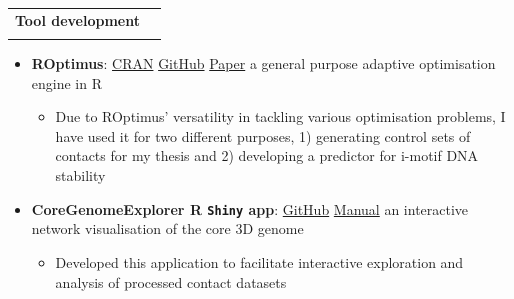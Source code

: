 \documentclass{article}
\makeatletter
\newcommand{\resumeItem}[2]{
  \item\small{
    \textbf{#1}{: #2 \vspace{-2pt}}
  }
}
\newcommand{\resumeSubheading}[4]{
  \vspace{-1pt}\item
    \begin{tabular*}{0.97\textwidth}[t]{l@{\extracolsep{\fill}}r}
      \textbf{#1} & #2 \\
      \textit{\small#3} & \textit{\small #4} \\
    \end{tabular*}\vspace{-5pt}
}
\newcommand{\resumeItemListStart}{\begin{itemize}}
\newcommand{\resumeItemListEnd}{\end{itemize}\vspace{-5pt}}
\makeatother
\begin{document}
        \resumeSubheading
        {Tool development}{}{}{}
            \resumeItemListStart
                \resumeItem{\textbf{ROptimus}}{\href{https://cran.r-project.org/web/packages/ROptimus/index.html}{CRAN} \href{https://github.com/SahakyanLab/ROptimus}{GitHub} \href{https://academic.oup.com/bioinformatics/article/39/5/btad292/7152277}{Paper} a general purpose adaptive optimisation engine in R}
                    \begin{itemize}
                        \item{Due to ROptimus' versatility in tackling various optimisation problems, I have used it for two different purposes, 1) generating control sets of contacts for my thesis and 2) developing a predictor for i-motif DNA stability}
                    \end{itemize}
                \resumeItem{\textbf{CoreGenomeExplorer} R \texttt{Shiny} app}{\href{https://github.com/liezeltamon/CoreGenomeExplorerLite}{GitHub} \href{https://drive.google.com/file/d/1gJW8q0Cp_I4p2ohbhuEblBcPgDbJfKKj/view?usp=share_link}{Manual} an interactive network visualisation of the core 3D genome}
                    \begin{itemize}
                        \item {Developed this application to facilitate interactive exploration and analysis of processed contact datasets}
                    \end{itemize}
            \resumeItemListEnd
\end{document}
